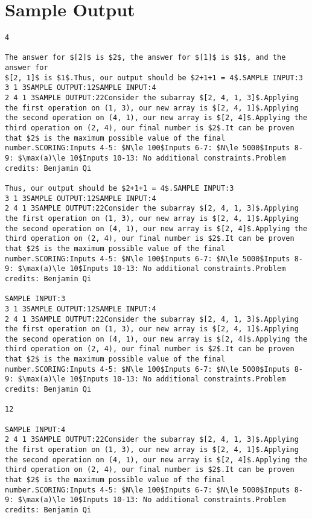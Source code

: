 \documentclass[12pt]{article}
\begin{document}
\section*{Sample Output}
\begin{verbatim}
4

The answer for $[2]$ is $2$, the answer for $[1]$ is $1$, and the answer for
$[2, 1]$ is $1$.Thus, our output should be $2+1+1 = 4$.SAMPLE INPUT:3
3 1 3SAMPLE OUTPUT:12SAMPLE INPUT:4
2 4 1 3SAMPLE OUTPUT:22Consider the subarray $[2, 4, 1, 3]$.Applying the first operation on (1, 3), our new array is $[2, 4, 1]$.Applying the second operation on (4, 1), our new array is $[2, 4]$.Applying the third operation on (2, 4), our final number is $2$.It can be proven that $2$ is the maximum possible value of the final number.SCORING:Inputs 4-5: $N\le 100$Inputs 6-7: $N\le 5000$Inputs 8-9: $\max(a)\le 10$Inputs 10-13: No additional constraints.Problem credits: Benjamin Qi

Thus, our output should be $2+1+1 = 4$.SAMPLE INPUT:3
3 1 3SAMPLE OUTPUT:12SAMPLE INPUT:4
2 4 1 3SAMPLE OUTPUT:22Consider the subarray $[2, 4, 1, 3]$.Applying the first operation on (1, 3), our new array is $[2, 4, 1]$.Applying the second operation on (4, 1), our new array is $[2, 4]$.Applying the third operation on (2, 4), our final number is $2$.It can be proven that $2$ is the maximum possible value of the final number.SCORING:Inputs 4-5: $N\le 100$Inputs 6-7: $N\le 5000$Inputs 8-9: $\max(a)\le 10$Inputs 10-13: No additional constraints.Problem credits: Benjamin Qi

SAMPLE INPUT:3
3 1 3SAMPLE OUTPUT:12SAMPLE INPUT:4
2 4 1 3SAMPLE OUTPUT:22Consider the subarray $[2, 4, 1, 3]$.Applying the first operation on (1, 3), our new array is $[2, 4, 1]$.Applying the second operation on (4, 1), our new array is $[2, 4]$.Applying the third operation on (2, 4), our final number is $2$.It can be proven that $2$ is the maximum possible value of the final number.SCORING:Inputs 4-5: $N\le 100$Inputs 6-7: $N\le 5000$Inputs 8-9: $\max(a)\le 10$Inputs 10-13: No additional constraints.Problem credits: Benjamin Qi

12

SAMPLE INPUT:4
2 4 1 3SAMPLE OUTPUT:22Consider the subarray $[2, 4, 1, 3]$.Applying the first operation on (1, 3), our new array is $[2, 4, 1]$.Applying the second operation on (4, 1), our new array is $[2, 4]$.Applying the third operation on (2, 4), our final number is $2$.It can be proven that $2$ is the maximum possible value of the final number.SCORING:Inputs 4-5: $N\le 100$Inputs 6-7: $N\le 5000$Inputs 8-9: $\max(a)\le 10$Inputs 10-13: No additional constraints.Problem credits: Benjamin Qi


\end{verbatim}
\end{document}
